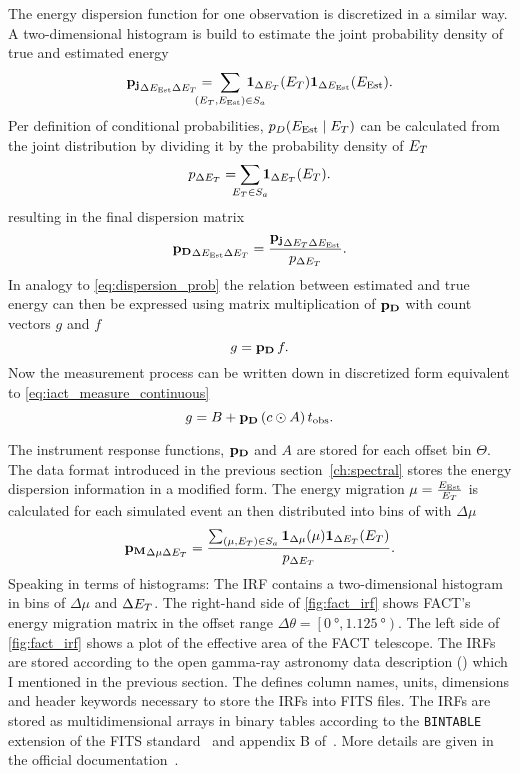 The energy dispersion function for one observation is discretized in a similar way.
A two-dimensional histogram is build to estimate the joint probability density of true and estimated energy
\begin{equation*}
  \mathbf{p_j}_{\Delta \eest \Delta \etrue } =\; \sum_{\mathclap{(\etrue, \eest) \in S_a}} \; \mathbf{1}_{\Delta \etrue}(\etrue) \mathbf{1}_{\Delta \eest}(\eest).
\end{equation*}
Per definition of conditional probabilities, $p_D(E_\text{Est} \mid E_T)$ can be calculated from the joint distribution by dividing 
it by the probability density of $E_T$
\begin{equation*}
  p_{\Delta \etrue} = \sum_{\mathclap{\etrue \in S_a}} \mathbf{1}_{\Delta \etrue}(\etrue).
\end{equation*}
resulting in the final dispersion matrix
\begin{equation*}
  \mathbf{p_D}_{ \Delta E_\text{Est} \Delta E_T} = \frac{\mathbf{p_j}_{\Delta E_T \Delta E_\text{Est}}}{p_{\Delta E_T}}.
\end{equation*}
In analogy to \cref{eq:dispersion_prob} the relation between estimated and true energy can then be expressed using 
matrix multiplication of $\mathbf{p_D}$ with count vectors $g$ and $f$
\begin{equation*}
  g = \mathbf{p_D} \, f.
\end{equation*}
Now the measurement process can be written down in discretized form equivalent to \cref{eq:iact_measure_continuous}
\begin{equation}
  \label{eq:iact_measurement_discrete}
  g = B + \mathbf{p_D} \, (c \odot A) \, t_{\text{obs}}.
\end{equation}

The instrument response functions, $\mathbf{p_D}$ and $A$ are stored for each offset bin $\Theta$. 
The data format introduced in the previous section~\ref{ch:spectral} stores the energy dispersion information
in a modified form.
The energy migration \mbox{$\mu=\frac{E_\text{Est}}{E_T}$} is calculated for each simulated event an then distributed into 
bins of with $\Delta\mu$
\begin{equation}
  \label{eq:migration_def}
  \mathbf{p_M}_{\Delta \mu \Delta E_T} = \frac{\sum_{(\mu, E_T) \in S_a} \mathbf{1}_{\Delta\mu}(\mu)  \mathbf{1}_{\Delta E_T}(E_T)}{p_{\Delta E_T}}.
\end{equation}
Speaking in terms of histograms: The IRF contains a two-dimensional histogram in bins of $\Delta\mu$ and $\Delta E_T$.
The right-hand side of \cref{fig:fact_irf} shows FACT's energy migration matrix in the offset range $\Delta\theta = \left[\SI{0}{\degree}, \SI{1.125}{\degree} \right)$.
The left side of \cref{fig:fact_irf} shows a plot of the effective area of the FACT telescope. 
The IRFs are stored according to the open gamma-ray astronomy data description (\oga) which I mentioned in the previous section.
The \oga defines column names, units, dimensions and header keywords necessary to store the IRFs into FITS files.
The IRFs are stored as multidimensional arrays in binary tables according to the \texttt{BINTABLE} extension of the FITS standard~\cite[S.7.3]{fits}
and appendix B of~\cite{fits_bintable}. More details are given in the official \oga documentation~\cite{oga_docs}. 


